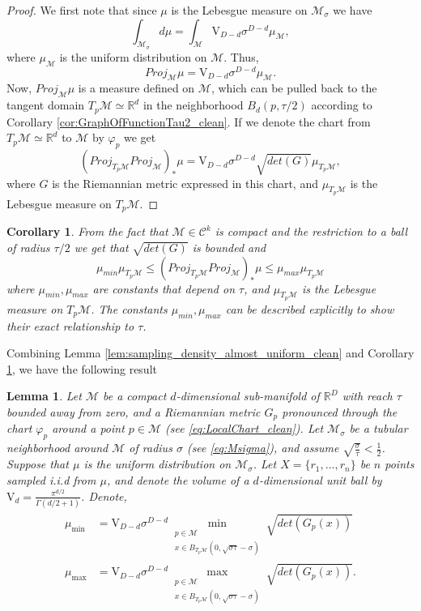 \documentclass[12pt]{article}
\newtheorem{Lemma}[Theorem]{Lemma}
\newtheorem{corollary}[Theorem]{Corollary}
\theoremstyle{remark}
\newcommand{\RR}{\mathbb{R}}
\newcommand{\MM}{\mathcal{M}}
\newcommand{\C}{\mathcal{C}}
\newcommand{\emphbrackets}[1]{\emph{(}#1\emph{)}}
\begin{document}
\begin{appendices}
\begin{proof}
We first note that since $\mu$ is the Lebesgue measure on $\MM_\sigma$ we have
\[
\int_{\MM_\sigma} d\mu = \int_{\MM}\mathrm{V}_{D-d}\sigma^{D-d}\mu_\MM
,\]
where $\mu_\MM$ is the uniform distribution on $\MM$. Thus,
\[
Proj_\MM \mu = {\mathrm{V}_{D-d}\sigma^{D-d}}\mu_\MM
.\]
Now, $Proj_\MM\mu$ is a measure defined on $\MM$, which can be pulled back to the tangent domain $T_p\MM\simeq\RR^d$ in the neighborhood $B_d(p, \tau/2)$ according to Corollary \ref{cor:GraphOfFunctionTau2_clean}.
If we denote the chart from $T_p\MM\simeq\RR^d$ to $\MM$ by $\varphi_p$ we get
\[
(Proj_{T_p\MM}Proj_\MM)_*\mu = \mathrm{V}_{D-d}\sigma^{D-d} \sqrt{det(G)}\mu_{T_p\MM}
,\]
where $G$ is the Riemannian metric expressed in this chart, and $\mu_{T_p\MM}$ is the Lebesgue measure on $T_p\MM$.

\end{proof}

\begin{corollary}\label{cor:measure_projecting_bounds_clean}
	From the fact that $\MM\in\C^k$ is compact and the restriction to a ball of radius $\tau/2$ we get that $\sqrt{det(G)}$ is bounded and
	\[
	\mu_{min} \mu_{T_p\MM} \leq (Proj_{T_p\MM}Proj_\MM)_*\mu \leq \mu_{max} \mu_{T_p\MM}
	\]
	where $\mu_{min}, \mu_{max}$ are constants that depend on $\tau$, and $\mu_{T_p\MM}$ is the Lebesgue measure on $T_p\MM$.
	The constants $ \mu_{min}, \mu_{max} $ can be described explicitly to show their exact relationship to $ \tau $.
\end{corollary}

Combining Lemma \ref{lem:sampling_density_almost_uniform_clean} and Corollary \ref{cor:measure_projecting_bounds_clean}, we have the following result

\begin{Lemma}\label{lem:num_of_samples_in_a_ball_clean}
	Let $\MM$ be a compact $d$-dimensional sub-manifold of $\RR^D$ with reach $\tau$  bounded away from zero, and a Riemannian metric $G_p$ pronounced through the chart $\varphi_p$ around a point $ p\in \MM $ \emphbrackets{see \eqref{eq:LocalChart_clean}}. 
    Let $\MM_\sigma$ be a tubular neighborhood around $ \MM $ of radius $ \sigma $ \emphbrackets{see \eqref{eq:Msigma}}, and assume $\sqrt{\frac{\sigma}{\tau}} < \frac{1}{2}$. 
    Suppose that $\mu$ is the uniform distribution on $ \MM_\sigma $. 
    Let $X = \{r_1, \ldots,r_n\}$ be $n$ points sampled i.i.d from $\mu$, and denote the volume of a $d$-dimensional unit ball by  $ \mathrm{V}_d = \frac{\pi^{d/2}}{\Gamma(d/2+1)} $.
    Denote,
    \begin{align}
    \label{eq:mu_min_max_def}
    \begin{split}
    \mu_{\min} &= \mathrm{V}_{D-d}\sigma^{D-d} \min_{\substack{p\in \MM\\ x\in B_{T_p\MM}(0,\sqrt{\sigma\tau}- \sigma)}}  \sqrt{det(G_p(x))}\\
    \mu_{\max} &= \mathrm{V}_{D-d}\sigma^{D-d}\max_{\substack{p\in \MM \\ x \in B_{T_p\MM}(0,\sqrt{\sigma\tau}- \sigma)}}  \sqrt{det(G_p(x))}
    .\end{split}
    \end{align}
    

\end{Lemma}
\end{appendices}
\end{document}
